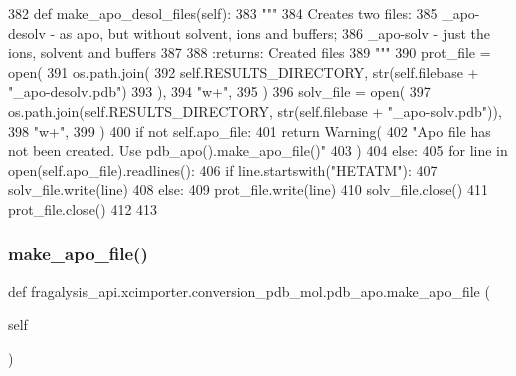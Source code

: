 \begin{DoxyCode}
382     \textcolor{keyword}{def }make\_apo\_desol\_files(self):
383         \textcolor{stringliteral}{"""}
384 \textcolor{stringliteral}{        Creates two files:}
385 \textcolor{stringliteral}{        \_apo-desolv - as apo, but without solvent, ions and buffers;}
386 \textcolor{stringliteral}{        \_apo-solv - just the ions, solvent and buffers}
387 \textcolor{stringliteral}{}
388 \textcolor{stringliteral}{        :returns: Created files}
389 \textcolor{stringliteral}{        """}
390         prot\_file = open(
391             os.path.join(
392                 self.RESULTS\_DIRECTORY, str(self.filebase + \textcolor{stringliteral}{"\_apo-desolv.pdb"})
393             ),
394             \textcolor{stringliteral}{"w+"},
395         )
396         solv\_file = open(
397             os.path.join(self.RESULTS\_DIRECTORY, str(self.filebase + \textcolor{stringliteral}{"\_apo-solv.pdb"})),
398             \textcolor{stringliteral}{"w+"},
399         )
400         \textcolor{keywordflow}{if} \textcolor{keywordflow}{not} self.apo\_file:
401             \textcolor{keywordflow}{return} Warning(
402                 \textcolor{stringliteral}{"Apo file has not been created. Use pdb\_apo().make\_apo\_file()"}
403             )
404         \textcolor{keywordflow}{else}:
405             \textcolor{keywordflow}{for} line \textcolor{keywordflow}{in} open(self.apo\_file).readlines():
406                 \textcolor{keywordflow}{if} line.startswith(\textcolor{stringliteral}{"HETATM"}):
407                     solv\_file.write(line)
408                 \textcolor{keywordflow}{else}:
409                     prot\_file.write(line)
410         solv\_file.close()
411         prot\_file.close()
412 
413 
\end{DoxyCode}
\mbox{\label{classfragalysis__api_1_1xcimporter_1_1conversion__pdb__mol_1_1pdb__apo_a08488b34eeb131d43d3139ecbbdb78fb}} 
\subsubsection{\texorpdfstring{make\+\_\+apo\+\_\+file()}{make\_apo\_file()}}
{\footnotesize\ttfamily def fragalysis\+\_\+api.\+xcimporter.\+conversion\+\_\+pdb\+\_\+mol.\+pdb\+\_\+apo.\+make\+\_\+apo\+\_\+file (\begin{DoxyParamCaption}\item[{}]{self }\end{DoxyParamCaption})}

